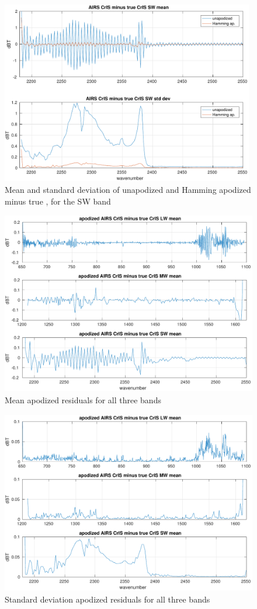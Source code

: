 \documentclass[12pt]{article}
\begin{document}
\begin{figure} %
  \centering
  \includegraphics[height=8cm]{figures/a2cris_diff_SW.pdf}
  \caption{Mean and standard deviation of unapodized and Hamming
    apodized {\airs} {\cris} minus true {\cris}, for the {\cris} SW
    band}
  \label{diffSW}
\end{figure}

\begin{figure} %
  \centering
  \includegraphics[height=8cm]{figures/combo_ap_dif_mean.pdf}
  \caption{Mean apodized residuals for all three bands}
  \label{meanAll}
\end{figure}

\begin{figure} %
  \centering
  \includegraphics[height=8cm]{figures/combo_ap_dif_std.pdf}
  \caption{Standard deviation apodized residuals for all three bands}
  \label{stdAll}
\end{figure}
\end{document}
